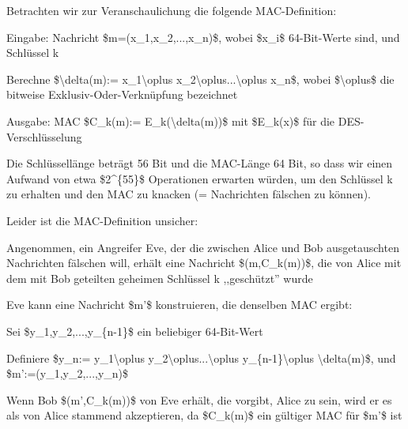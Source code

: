\documentclass[a4paper]{article}
\begin{document}
\begin{multicols}{3}
      \begin{itemize*}
            \item Betrachten wir zur Veranschaulichung die folgende MAC-Definition:
            \begin{itemize*}
                  \item Eingabe: Nachricht \$m=(x\_1,x\_2,...,x\_n)\$, wobei \$x\_i\$ 64-Bit-Werte sind, und Schlüssel k
                  \item Berechne \$\textbackslash delta(m):= x\_1\textbackslash oplus x\_2\textbackslash oplus...\textbackslash oplus x\_n\$, wobei \$\textbackslash oplus\$ die bitweise Exklusiv-Oder-Verknüpfung bezeichnet
                  \item Ausgabe: MAC \$C\_k(m):= E\_k(\textbackslash delta(m))\$ mit \$E\_k(x)\$ für die DES-Verschlüsselung
            \end{itemize*}
            \item Die Schlüssellänge beträgt 56 Bit und die MAC-Länge 64 Bit, so dass
            wir einen Aufwand von etwa \$2\^{}\{55\}\$ Operationen erwarten
            würden, um den Schlüssel k zu erhalten und den MAC zu knacken (=
            Nachrichten fälschen zu können).
            \item Leider ist die MAC-Definition unsicher:
            \begin{itemize*}
                  \item Angenommen, ein Angreifer Eve, der die zwischen Alice und Bob ausgetauschten Nachrichten fälschen will, erhält eine Nachricht \$(m,C\_k(m))\$, die von Alice mit dem mit Bob geteilten geheimen Schlüssel k ,,geschützt'' wurde
                  \item Eve kann eine Nachricht \$m'\$ konstruieren, die denselben MAC ergibt:
                  \begin{itemize*} \item Sei \$y\_1,y\_2,...,y\_\{n-1\}\$ ein beliebiger 64-Bit-Wert \item Definiere \$y\_n:= y\_1\textbackslash oplus y\_2\textbackslash oplus...\textbackslash oplus y\_\{n-1\}\textbackslash oplus \textbackslash delta(m)\$, und \$m':=(y\_1,y\_2,...,y\_n)\$ \item Wenn Bob \$(m',C\_k(m))\$ von Eve erhält, die vorgibt, Alice zu sein, wird er es als von Alice stammend akzeptieren, da \$C\_k(m)\$ ein gültiger MAC für \$m'\$ ist \end{itemize*}
            \end{itemize*}
      \end{itemize*}



\end{multicols}
\end{document}
